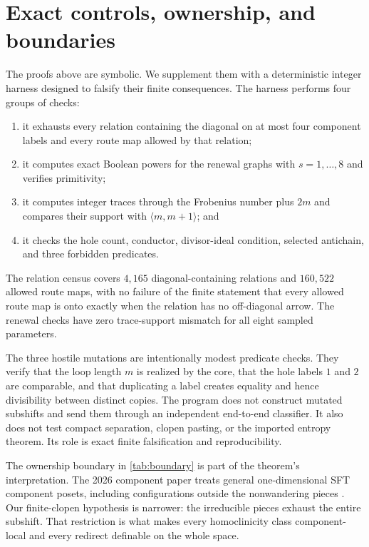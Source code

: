 \section{Exact controls, ownership, and boundaries}
\label{sec:controls}

The proofs above are symbolic.  We supplement them with a deterministic
integer harness designed to falsify their finite consequences.  The harness
performs four groups of checks:

\begin{enumerate}[label=(\roman*)]
  \item it exhausts every relation containing the diagonal on at most four
  component labels and every route map allowed by that relation;
  \item it computes exact Boolean powers for the renewal graphs with
  $s=1,\ldots,8$ and verifies primitivity;
  \item it computes integer traces through the Frobenius number plus $2m$ and
  compares their support with $\langle m,m+1\rangle$; and
  \item it checks the hole count, conductor, divisor-ideal condition, selected
  antichain, and three forbidden predicates.
\end{enumerate}

The relation census covers $4{,}165$ diagonal-containing relations and
$160{,}522$ allowed route maps, with no failure of the finite statement that
every allowed route map is onto exactly when the relation has no
off-diagonal arrow.  The renewal checks have zero trace-support mismatch for
all eight sampled parameters.

The three hostile mutations are intentionally modest predicate checks.  They
verify that the loop length $m$ is realized by the core, that the hole labels
$1$ and $2$ are comparable, and that duplicating a label creates equality and
hence divisibility between distinct copies.  The program does not construct
mutated subshifts and send them through an independent end-to-end classifier.
It also does not test compact separation, clopen pasting, or the imported
entropy theorem.  Its role is exact finite falsification and reproducibility.



The ownership boundary in \cref{tab:boundary} is part of the theorem's
interpretation.  The 2026 component paper treats general one-dimensional SFT
component posets, including configurations outside the nonwandering pieces
\cite{ceccheriniCoornaertSalo2026}.  Our finite-clopen hypothesis is narrower:
the irreducible pieces exhaust the entire subshift.  That restriction is what
makes every homoclinicity class component-local and every redirect definable
on the whole space.

